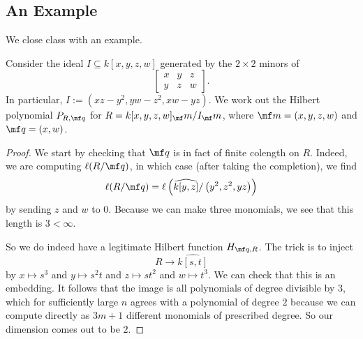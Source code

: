 \documentclass[../notes.tex]{subfiles}
\begin{document}
\subsection{An Example}
We close class with an example.
\begin{exe}[Eisenbud 12.2]
	Consider the ideal $I\subseteq k[x,y,z,w]$ generated by the $2\times 2$ minors of
	\[\begin{bmatrix}
		x & y & z \\
		y & z & w
	\end{bmatrix}.\]
	In particular, $I:=\left(xz-y^2,yw-z^2,xw-yz\right)$. We work out the Hilbert polynomial $P_{R,\mf q}$ for $R=k[x,y,z,w]_\mf m/I_\mf m$, where $\mf m=(x,y,z,w)$ and $\mf q=(x,w)$.
\end{exe}
\begin{proof}
	We start by checking that $\mf q$ is in fact of finite colength on $R$. Indeed, we are computing $\ell(R/\mf q)$, in which case (after taking the completion), we find
	\[\ell(R/\mf q)=\ell\left(\widehat{k[y,z]}/\left(y^2,z^2,yz\right)\right)\]
	by sending $z$ and $w$ to $0$. Because we can make three monomials, we see that this length is $3<\infty$.

	So we do indeed have a legitimate Hilbert function $H_{\mf q,R}$. The trick is to inject
	\[R\to\widehat{k[s,t]}\]
	by $x\mapsto s^3$ and $y\mapsto s^2t$ and $z\mapsto st^2$ and $w\mapsto t^3$. We can check that this is an embedding. It follows that the image is all polynomials of degree divisible by $3$, which for sufficiently large $n$ agrees with a polynomial of degree $2$ because we can compute directly as $3m+1$ different monomials of prescribed degree. So our dimension comes out to be $\boxed2$.
\end{proof}
\end{document}
